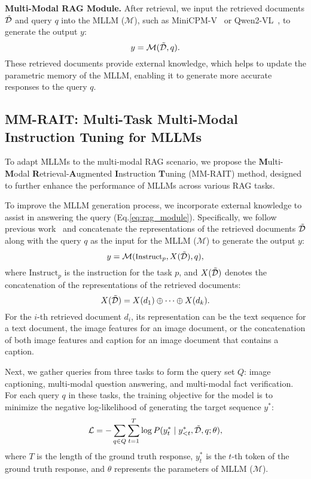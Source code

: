 \textbf{Multi-Modal RAG Module.}
After retrieval, we input the retrieved documents $\Tilde{\mathcal{D}}$ and query $q$ into the MLLM ($\mathcal{M}$), such as MiniCPM-V~\cite{yao2024minicpm} or Qwen2-VL~\cite{Qwen2VL}, to generate the output $y$:
\begin{equation}\label{eq:rag_module}
\small
y = \mathcal{M}(\Tilde{\mathcal{D}},q). 
\end{equation} 
These retrieved documents provide external knowledge, which helps to update the parametric memory of the MLLM, enabling it to generate more accurate responses to the query $q$.

\subsection{MM-RAIT: Multi-Task Multi-Modal Instruction Tuning for MLLMs}
\label{method:mmtuning}
To adapt MLLMs to the multi-modal RAG scenario, we propose the \textbf{M}ulti-\textbf{M}odal \textbf{R}etrieval-\textbf{A}ugmented \textbf{I}nstruction \textbf{T}uning (MM-RAIT) method, designed to further enhance the performance of MLLMs across various RAG tasks.

To improve the MLLM generation process, we incorporate external knowledge to assist in answering the query (Eq.\ref{eq:rag_module}). Specifically, we follow previous work~\cite{ram2023context} and concatenate the representations of the retrieved documents $\Tilde{\mathcal{D}}$ along with the query $q$ as the input for the MLLM ($\mathcal{M}$) to generate the output $y$: 
\begin{equation} 
\small
y = \mathcal{M}(\text{Instruct}_p,X(\Tilde{\mathcal{D}}),q), 
\end{equation} 
where $\text{Instruct}_p$ is the instruction for the task $p$, and $X(\Tilde{\mathcal{D}})$ denotes the concatenation of the representations of the retrieved documents: 
\begin{equation}\small
X(\Tilde{\mathcal{D}}) = X(d_1) \oplus \dots \oplus X(d_k). 
\end{equation} 
For the $i$-th retrieved document $d_i$, its representation can be the text sequence for a text document, the image features for an image document, or the concatenation of both image features and caption for an image document that contains a caption.

Next, we gather queries from three tasks to form the query set $Q$: image captioning, multi-modal question answering, and multi-modal fact verification. For each query $q$ in these tasks, the training objective for the model is to minimize the negative log-likelihood of generating the target sequence $y^*$: 
\begin{equation} 
\small
\mathcal{L} = - \sum_{q \in Q} \sum_{t=1}^T \log P(y^*_{t} \mid y^*_{<t}, \Tilde{\mathcal{D}}, q; \theta),
\end{equation} 
where $T$ is the length of the ground truth response, $y^*_{t}$ is the $t$-th token of the ground truth response, and $\theta$ represents the parameters of MLLM ($\mathcal{M}$).